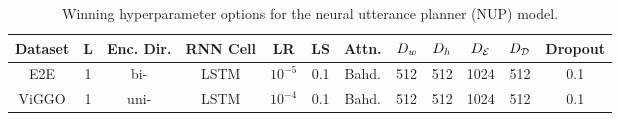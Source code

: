 \begin{table}
\centering
\begin{tabular}{c ccc ccc ccccc}
\toprule
Dataset & L & Enc. Dir. & RNN Cell& LR & LS & Attn. &$D_{w}$ & $D_{h}$  & ${D_\mathcal{E}}$ & ${D_\mathcal{D}}$ & Dropout \\
\midrule
   E2E & 1 & bi- &LSTM& $10^{-5}$ & 0.1 & Bahd. & 512 & 512 & 1024 & 512 & 0.1\\
ViGGO & 1 & uni- & LSTM & $10^{-4}$ & 0.1 & Bahd.  & 512 & 512 & 1024 & 512 & 0.1\\ 
\bottomrule
\end{tabular}
\caption{Winning hyperparameter options for the neural utterance planner (NUP)
model.}
\label{tab:nuphp}
\end{table}
